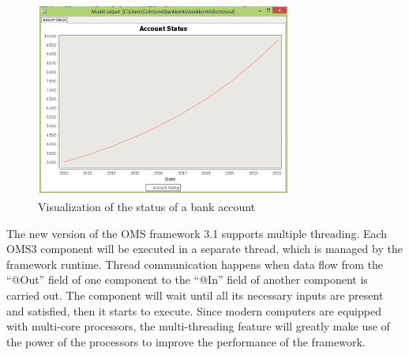 \begin{figure}[htbp]
	\centering
	\includegraphics[width=0.75\textwidth]{pics/oms/Figure10.png}
	\caption{Visualization of the status of a bank account
 \label{fig:Visualization_Bank_Account}}	
\end{figure}
\par
The new version of the OMS framework 3.1 supports multiple threading. Each OMS3 component will be executed in a separate thread, which is managed by the framework runtime. Thread communication happens when data flow from the “@Out” field of one component to the “@In” field of another component is carried out. The component will wait until all its necessary inputs are present and satisfied, then it starts to execute. Since modern computers are equipped with multi-core processors, the multi-threading feature will greatly make use of the power of the processors to improve the performance of the framework.
\par
